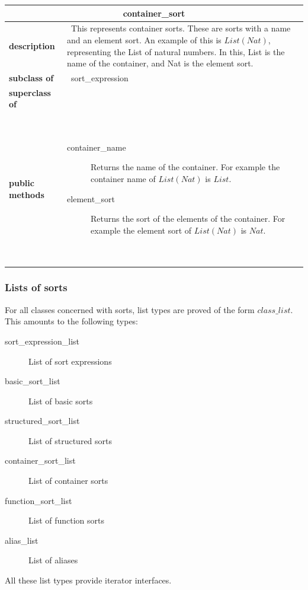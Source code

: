 \documentclass[a4paper,11pt]{article}
\newcommand{\List}{{\mathit{List}}}
\newcommand{\dataclass}[5]{
\begin{flushleft}
\begin{longtable}{p{3cm} p{11cm}}
\multicolumn{2}{c}{\textbf{#1}}\\\hline\hline
\textbf{description} & ~#2~ \\\hline
\textbf{subclass of} & ~#3~ \\\hline
\textbf{superclass of} & ~#4~ \\\hline
\textbf{public methods} & ~#5~ \\\hline
\end{longtable}
\end{flushleft}
}
\begin{document}
\dataclass
  {container\_sort}
  {This represents container sorts. These are sorts with a name and an element sort. An example of this is $\List(Nat)$, representing the List of natural numbers. In this, List is the name of the container, and Nat is the element sort.}
  {sort\_expression}
  {}
  {\begin{description}
    \item[container\_name] Returns the name of the container. For example the container name of $\List(Nat)$ is $List$.
    \item[element\_sort] Returns the sort of the elements of the container. For example the element sort of $\List(Nat)$ is $Nat$.
   \end{description}}



\subsubsection{Lists of sorts}
For all classes concerned with sorts, list types are proved of the form $class\_list$. This amounts to the following types:
\begin{description}
 \item[sort\_expression\_list] List of sort expressions
 \item[basic\_sort\_list] List of basic sorts
 \item[structured\_sort\_list] List of structured sorts
 \item[container\_sort\_list] List of container sorts
 \item[function\_sort\_list] List of function sorts
 \item[alias\_list] List of aliases
\end{description}

All these list types provide iterator interfaces.

\FloatBarrier
\end{document}
